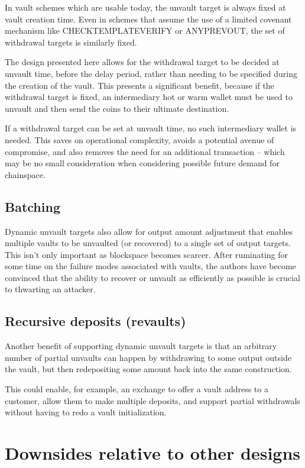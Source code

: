 \documentclass[10pt]{article}
\begin{document}
In vault schemes which are usable today, the unvault target is always fixed at vault
creation time. Even in schemes that assume the use of a limited covenant mechanism like
CHECKTEMPLATEVERIFY or ANYPREVOUT, the set of withdrawal targets is similarly fixed.

The design presented here allows for the withdrawal target to be decided at unvault
time, before the delay period, rather than needing to be specified during the creation
of the vault. This presents a significant benefit, because if the withdrawal target is
fixed, an intermediary hot or warm wallet must be used to unvault and then send the
coins to their ultimate destination.

If a withdrawal target can be set at unvault time, no such intermediary wallet is
needed. This saves on operational complexity, avoids a potential avenue of compromise,
and also removes the need for an additional transaction -- which may be no small
consideration when considering possible future demand for chainspace.

\subsection*{Batching}

Dynamic unvault targets also allow for output amount adjustment that enables multiple
vaults to be unvaulted (or recovered) to a single set of output targets. This isn't
only important as blockspace becomes scarcer. After ruminating for some time on the
failure modes associated with vaults, the authors have become convinced that the
ability to recover or unvault as efficiently as possible is crucial
to thwarting an attacker.

\subsection*{Recursive deposits (revaults)}

Another benefit of supporting dynamic unvault targets is that an arbitrary number of
partial unvaults can happen by withdrawing to some output outside the vault, but then
redepositing some amount back into the same  construction.

This could enable, for example, an exchange to offer a vault address to a customer,
allow them to make multiple deposits, and support partial withdrawals without having to
redo a vault initialization.

\section*{Downsides relative to other designs}
\end{document}
